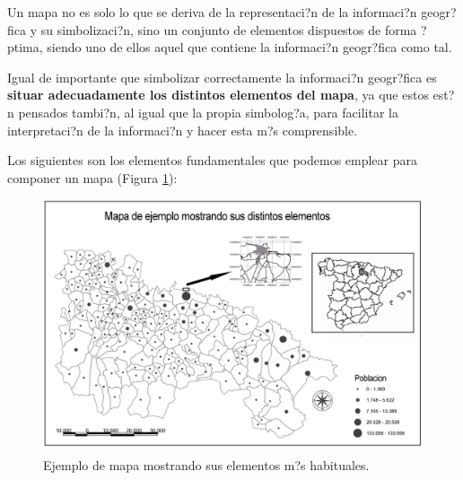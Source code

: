 Un mapa no es solo lo que se deriva de la representaci?n de la informaci?n geogr?fica y su simbolizaci?n, sino un conjunto de elementos dispuestos de forma ?ptima, siendo uno de ellos aquel que contiene la informaci?n geogr?fica como tal.

Igual de importante que simbolizar correctamente la informaci?n geogr?fica es \textbf{situar adecuadamente los distintos elementos del mapa}, ya que estos est?n pensados tambi?n, al igual que la propia simbolog?a, para facilitar la interpretaci?n de la informaci?n y hacer esta m?s comprensible.

Los siguientes son los elementos fundamentales que podemos emplear para componer un mapa (Figura \ref{Fig:ElementosMapa}):

\begin{figure}[!hbt]
\centering
\includegraphics[width=\columnwidth]{../es/Visualizacion/ElementosMapa.png}
\caption{\small Ejemplo de mapa mostrando sus elementos m?s habituales.}
\label{Fig:ElementosMapa} 
\end{figure}


